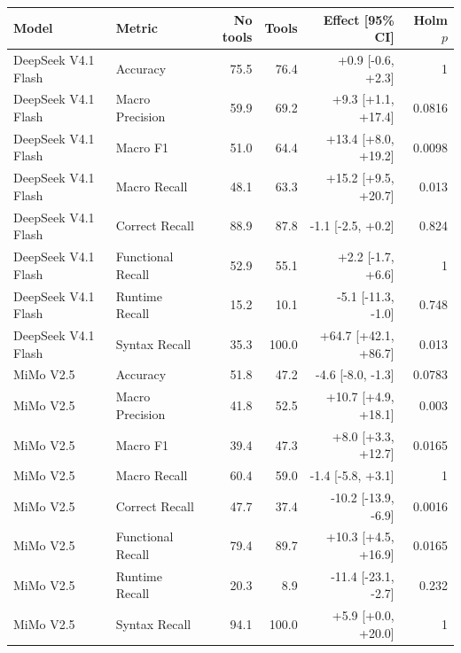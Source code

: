 \begin{table}[htbp]
\centering
\begin{tabular}{llrrrr}
\toprule
Model & Metric & No tools & Tools & Effect [95\% CI] & Holm $p$ \\
\midrule
DeepSeek V4.1 Flash & Accuracy & 75.5 & 76.4 & +0.9 [-0.6, +2.3] & 1 \\
DeepSeek V4.1 Flash & Macro Precision & 59.9 & 69.2 & +9.3 [+1.1, +17.4] & 0.0816 \\
DeepSeek V4.1 Flash & Macro F1 & 51.0 & 64.4 & +13.4 [+8.0, +19.2] & 0.0098 \\
DeepSeek V4.1 Flash & Macro Recall & 48.1 & 63.3 & +15.2 [+9.5, +20.7] & 0.013 \\
DeepSeek V4.1 Flash & Correct Recall & 88.9 & 87.8 & -1.1 [-2.5, +0.2] & 0.824 \\
DeepSeek V4.1 Flash & Functional Recall & 52.9 & 55.1 & +2.2 [-1.7, +6.6] & 1 \\
DeepSeek V4.1 Flash & Runtime Recall & 15.2 & 10.1 & -5.1 [-11.3, -1.0] & 0.748 \\
DeepSeek V4.1 Flash & Syntax Recall & 35.3 & 100.0 & +64.7 [+42.1, +86.7] & 0.013 \\
MiMo V2.5 & Accuracy & 51.8 & 47.2 & -4.6 [-8.0, -1.3] & 0.0783 \\
MiMo V2.5 & Macro Precision & 41.8 & 52.5 & +10.7 [+4.9, +18.1] & 0.003 \\
MiMo V2.5 & Macro F1 & 39.4 & 47.3 & +8.0 [+3.3, +12.7] & 0.0165 \\
MiMo V2.5 & Macro Recall & 60.4 & 59.0 & -1.4 [-5.8, +3.1] & 1 \\
MiMo V2.5 & Correct Recall & 47.7 & 37.4 & -10.2 [-13.9, -6.9] & 0.0016 \\
MiMo V2.5 & Functional Recall & 79.4 & 89.7 & +10.3 [+4.5, +16.9] & 0.0165 \\
MiMo V2.5 & Runtime Recall & 20.3 & 8.9 & -11.4 [-23.1, -2.7] & 0.232 \\
MiMo V2.5 & Syntax Recall & 94.1 & 100.0 & +5.9 [+0.0, +20.0] & 1 \\
\bottomrule
\end{tabular}
\end{table}
